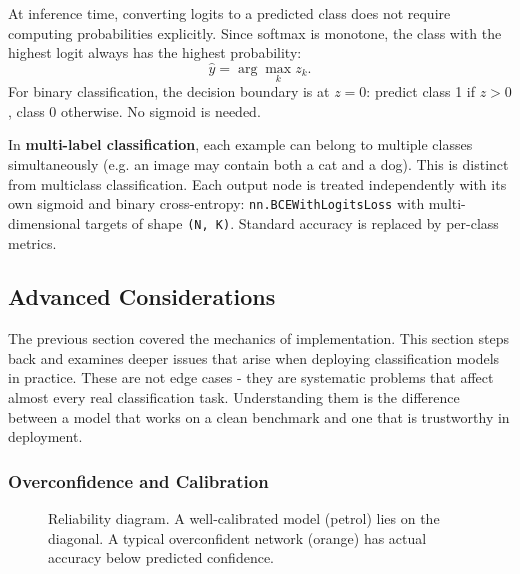 At inference time, converting logits to a predicted class does not require computing probabilities explicitly. Since softmax is monotone, the class with the highest logit always has the highest probability:
\begin{equation}
    \hat{y} = \arg\max_k z_k.
\end{equation}
For binary classification, the decision boundary is at $z = 0$: predict class 1 if $z > 0$, class 0 otherwise. No sigmoid is needed.

In \textbf{multi-label classification}, each example can belong to multiple classes simultaneously (e.g. an image may contain both a cat and a dog). This is distinct from multiclass classification. Each output node is treated independently with its own sigmoid and binary cross-entropy: \texttt{nn.BCEWithLogitsLoss} with multi-dimensional targets of shape \texttt{(N, K)}. Standard accuracy is replaced by per-class metrics.

\subsection{Advanced Considerations}

The previous section covered the mechanics of implementation. This section steps back and examines deeper issues that arise when deploying classification models in practice. These are not edge cases - they are systematic problems that affect almost every real classification task. Understanding them is the difference between a model that works on a clean benchmark and one that is trustworthy in deployment.


\subsubsection{Overconfidence and Calibration}\label{sec:calibration}

\begin{figure}
\centering
{}
\resizebox{0.40\textwidth}{!}{}
\caption{Reliability diagram. A well-calibrated model (petrol) lies on the diagonal. A typical overconfident network (orange) has actual accuracy below predicted confidence.}
\label{fig:reliability}
\end{figure}

